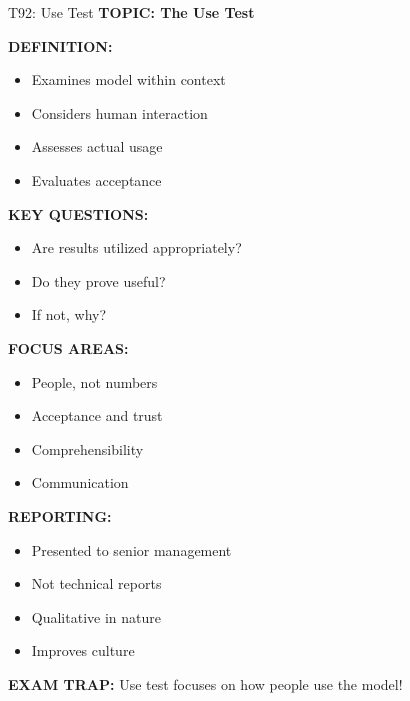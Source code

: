 \documentclass[8pt]{beamer}
\begin{document}
	\begin{frame}{T92: Use Test}
		\fontsize{6.5}{7.5}\selectfont
		\textbf{TOPIC: The Use Test}
		
		\vspace{0.1cm}
		\textbf{DEFINITION:}
		\begin{itemize}
			\item Examines model within context
			\item Considers human interaction
			\item Assesses actual usage
			\item Evaluates acceptance
		\end{itemize}
		
		\vspace{0.1cm}
		\textbf{KEY QUESTIONS:}
		\begin{itemize}
			\item Are results utilized appropriately?
			\item Do they prove useful?
			\item If not, why?
		\end{itemize}
		
		\vspace{0.1cm}
		\textbf{FOCUS AREAS:}
		\begin{itemize}
			\item People, not numbers
			\item Acceptance and trust
			\item Comprehensibility
			\item Communication
		\end{itemize}
		
		\vspace{0.1cm}
		\textbf{REPORTING:}
		\begin{itemize}
			\item Presented to senior management
			\item Not technical reports
			\item Qualitative in nature
			\item Improves culture
		\end{itemize}
		
		\textcolor{myred}{\textbf{EXAM TRAP:}} Use test focuses on \textcolor{myblue}{how people use the model}!
	\end{frame}
	
\end{document}
